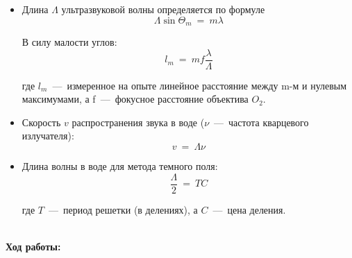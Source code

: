 \documentclass[a4paper, 12pt]{article}
\begin{document}
    \begin{itemize}
        \item Длина $\Lambda$ ультразвуковой волны определяется по формуле
            \begin{equation}
                \label{eq1}
                \Lambda\sin{\Theta_m}~=~m\lambda 
            \end{equation}

            В силу малости углов:
            \begin{equation}
                \label{eq2}
                l_m~=~mf\dfrac{\lambda}{\Lambda}
            \end{equation}

            где $l_m$~---~измеренное на опыте линейное расстояние между m-м и нулевым максимумами, а f~---~фокусное расстояние объектива $O_2$.

        \item Скорость $v$ распространения звука в воде ($\nu$~---~частота кварцевого излучателя):
            \begin{equation}
                \label{eq3}
                v~=~\Lambda \nu
            \end{equation}

        \item Длина волны в воде для метода темного поля:
            \begin{equation}
                \label{eq4}
                \dfrac{\Lambda}{2}~=~T C
            \end{equation}

            где $T$~---~период решетки (в делениях), а $C$~---~цена деления.
    \end{itemize}

    \textbf{\\Ход работы:}
\end{document}
